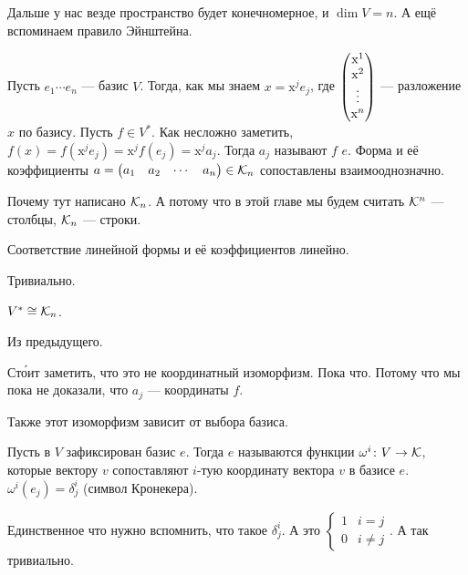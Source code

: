 \documentclass{article}
\begin{document}
\begin{itemize}
        \begin{Comment}
            Дальше у нас везде пространство будет конечномерное, и $\dim V=n$. А ещё вспоминаем правило Эйнштейна.
        \end{Comment}
        \dfn Пусть $e_1\cdots e_n$ --- базис $V$. Тогда, как мы знаем $x=\mathrm x^je_j$, где $\left(\begin{matrix}\mathrm x^1\\\mathrm x^2\\\vdots\\\mathrm x^n\end{matrix}\right)$ --- разложение $x$ по базису. Пусть $f\in V^*$. Как несложно заметить, $f(x)=f(\mathrm x^je_j)=\mathrm x^jf(e_j)=\mathrm x^ja_j$. Тогда $a_j$ называют  $f$  $e$.
        \thm Форма и её коэффициенты $a=\left(\begin{matrix}a_1 & a_2 & \cdots & a_n\end{matrix}\right)\in{\mathcal{K}}_n$ сопоставлены взаимооднозначно.
        \begin{Comment}
            Почему тут написано ${\mathcal{K}}_n$. А потому что в этой главе мы будем считать ${\mathcal{K}}^n$ --- столбцы, ${\mathcal{K}}_n$ --- строки.
        \end{Comment}
        \thm Соответствие линейной формы и её коэффициентов линейно.
        \begin{Proof}
            Тривиально.
        \end{Proof}
        \thm $V^*\cong{\mathcal{K}}_n$.
        \begin{Proof}
            Из предыдущего.
        \end{Proof}
        \begin{Comment}
            Ст\'{о}ит заметить, что это не координатный изоморфизм. Пока что. Потому что мы пока не доказали, что $a_j$ --- координаты $f$.
        \end{Comment}
        \begin{Comment}
            Также этот изоморфизм зависит от выбора базиса.
        \end{Comment}
        \dfn Пусть в $V$ зафиксирован базис $e$. Тогда  $e$ называются функции $\omega^i\colon V\to{\mathcal{K}}$, которые вектору $v$ сопоставляют $i$-тую координату вектора $v$ в базисе $e$.
        \thm $\omega^i(e_j)=\delta^i_j$ (символ Кронекера).
        \begin{Proof}
            Единственное что нужно вспомнить, что такое $\delta_j^i$. А это $\begin{cases}
                1 & i=j\\
                0 & i\neq j
            \end{cases}$. А так тривиально.

\end{Proof}
\end{itemize}
\end{document}
